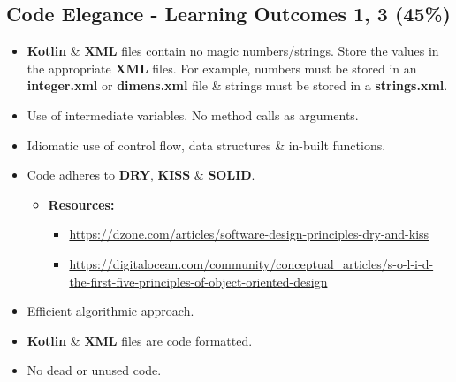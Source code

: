 \documentclass{article}
\begin{document}
\subsection*{Code Elegance - Learning Outcomes 1, 3 (45\%)}
\begin{itemize}
	\item \textbf{Kotlin} \& \textbf{XML} files contain no magic numbers/strings. Store the values in the appropriate \textbf{XML} files. For example, numbers must be stored in an \textbf{integer.xml} or \textbf{dimens.xml} file \& strings must be stored in a \textbf{strings.xml}.
	\item Use of intermediate variables. No method calls as arguments.
	\item Idiomatic use of control flow, data structures \& in-built functions.
	\item Code adheres to \textbf{DRY}, \textbf{KISS} \& \textbf{SOLID}.
	\begin{itemize}
		\item \textbf{Resources:}
		\begin{itemize}
			\item \footnotesize\href{https://dzone.com/articles/software-design-principles-dry-and-kiss}{https://dzone.com/articles/software-design-principles-dry-and-kiss}
			\item \footnotesize\href{https://digitalocean.com/community/conceptual\_articles/s-o-l-i-d-the-first-five-principles-of-object-oriented-design}{https://digitalocean.com/community/conceptual\_articles/s-o-l-i-d-the-first-five-principles-of-object-oriented-design}
		\end{itemize}
	\end{itemize}
	\item Efficient algorithmic approach.
	\item \textbf{Kotlin} \& \textbf{XML} files are code formatted.
	\item No dead or unused code.
\end{itemize}
\end{document}
